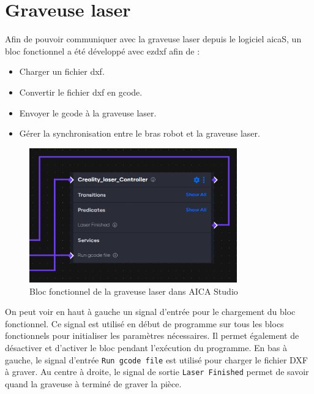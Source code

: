 \section{Graveuse laser}
Afin de pouvoir communiquer avec la graveuse laser depuis le logiciel \gls{aicaS}, un bloc fonctionnel a été développé avec \gls{ezdxf} \cite{DXFDocs} afin de :
\begin{itemize}
    \item Charger un fichier \gls{dxf}.
    \item Convertir le fichier \gls{dxf} en \gls{gcode}.
    \item Envoyer le \gls{gcode} à la graveuse laser.
    \item Gérer la synchronisation entre le bras robot et la graveuse laser.
\end{itemize}

\begin{figure}[H]
    \centering
    \includegraphics[width=0.8\textwidth]{assets/figures/AICA_Laser_interface.png}
    \caption{Bloc fonctionnel de la graveuse laser dans AICA Studio}
    \label{fig:laser_interface}
\end{figure}

On peut voir en haut à gauche un signal d'entrée pour le chargement du bloc fonctionnel. Ce signal est utilisé en début de programme sur tous les blocs fonctionnels pour initialiser les paramètres nécessaires. Il permet également de désactiver et d'activer le bloc pendant l'exécution du programme. En bas à gauche, le signal d'entrée \texttt{Run gcode file} est utilisé pour charger le fichier DXF à graver. Au centre à droite, le signal de sortie \texttt{Laser Finished} permet de savoir quand la graveuse à terminé de graver la pièce.

